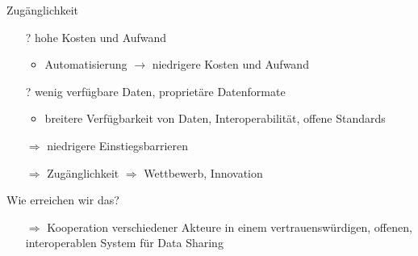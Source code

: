 \begin{frame}{Zugänglichkeit}
    \begin{itemize}
        \item[?] hohe Kosten und Aufwand
        \pause
        \begin{itemize}
            \item Automatisierung $\to$ niedrigere Kosten und Aufwand
        \end{itemize}

        \pause
        \item[?] wenig verfügbare Daten, proprietäre Datenformate
        \pause
        \begin{itemize}
            \item breitere Verfügbarkeit von Daten, Interoperabilität, offene Standards
        \end{itemize}
    \end{itemize}

    \pause
    \begin{itemize}
        \item[$\Rightarrow$] niedrigere Einstiegsbarrieren
        \item[$\Rightarrow$] Zugänglichkeit $\Rightarrow$ Wettbewerb, Innovation
    \end{itemize}
\end{frame}


\begin{frame}{Wie erreichen wir das?}
    

    \vspace{1em}

    \begin{itemize}
        \large
        \item[$\Rightarrow$] Kooperation verschiedener Akteure in einem vertrauenswürdigen, offenen, interoperablen System für Data Sharing
    \end{itemize}

\end{frame}
